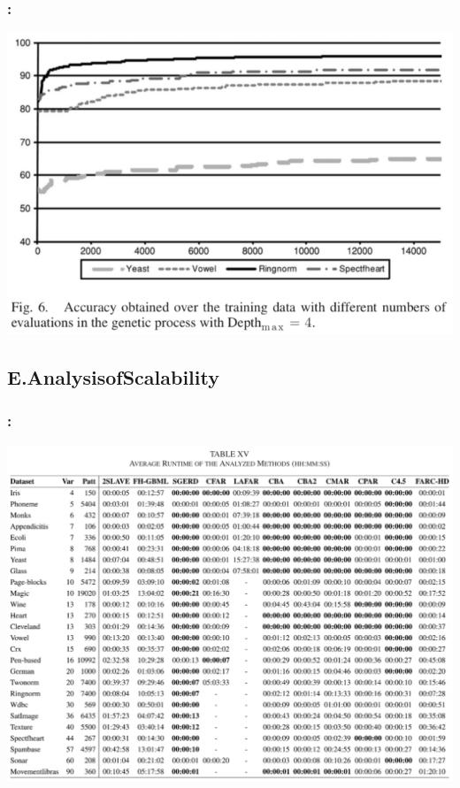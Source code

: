 \documentclass{beamer}
\begin{document}
\begin{CJK*}{UTF8}{bsmi}

\begin{frame}
	\frametitle{\insertsection : \insertsubsection}
	\begin{center}
		\includegraphics[width=1\textheight]{./23.png}
	\end{center}
\end{frame}


\subsection{E.AnalysisofScalability}


\begin{frame}
	\frametitle{\insertsection : \insertsubsection}
	\begin{center}
		\includegraphics[width=1\textheight]{./24.png}
	\end{center}
\end{frame}


\end{CJK*}
\end{document}
